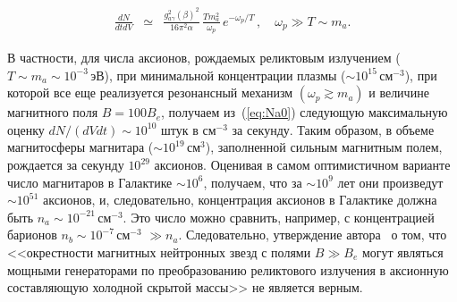 %
\begin{eqnarray}
\label{eq:Na2}
\frac{dN}{dt dV} &\simeq&  \frac{g_{a\gamma}^2 (\beta)^2}{16 \pi^2 \alpha} \,
\frac{T m_a^2}{\omega_p}  \, e^{-\omega_p/T} \, , \quad \omega_p \gg T \sim m_a.
\end{eqnarray}
%



В частности, для числа аксионов, рождаемых реликтовым излучением 
($T \sim m_a \sim 10^{-3}$\,эВ), при  
 минимальной  концентрации плазмы ($\sim 10^{15}$\,см$^{-3}$), при которой все еще 
 реализуется  резонансный механизм $(\omega_p \gtrsim  m_a)$ и величине магнитного поля 
 $B=100B_e$, получаем из~(\ref{eq:Na0})  
следующую максимальную оценку $dN/(dV dt)\sim 10^{10}$ штук в см$^{-3}$ за секунду. 
 Таким образом, в объеме магнитосферы магнитара 
 ($\sim 10^{19}$\,см$^3$), заполненной сильным магнитным полем,  рождается за секунду 
 $10^{29}$ аксионов. Оценивая в самом оптимистичном варианте 
 число магнитаров в Галактике $\sim 10^6$, получаем, 
 что за $\sim 10^9$ лет они произведут $\sim 10^{51}$ аксионов, и, следовательно, 
 концентрация  аксионов в Галактике должна быть  $n_a \sim 10^{-21}$\,см$^{-3}$. Это число
 можно сравнить, например, с концентрацией барионов $n_b \sim 10^{-7}$\,см$^{-3}$ $\gg n_a$.  
 Следовательно, утверждение автора~\cite{Skobelev:2007} о том, что <<окрестности 
 магнитных нейтронных 
 звезд с полями $B \gg B_e$ могут являться мощными генераторами по преобразованию 
 реликтового излучения в аксионную составляющую холодной скрытой массы>> не является 
 верным.
 
 